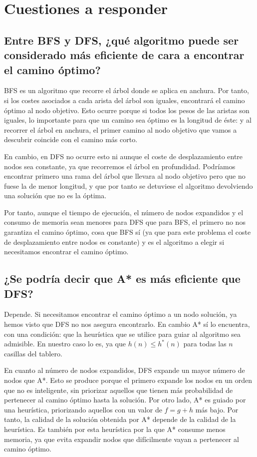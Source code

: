\documentclass[12pt]{article} %
\begin{document}
\section{Cuestiones a responder}
\subsection{Entre BFS y DFS, ¿qué algoritmo puede ser considerado más eficiente de cara a encontrar el camino óptimo?}

BFS es un algoritmo que recorre el árbol donde se aplica en anchura. Por tanto, si los costes asociados a cada arista del árbol son iguales, encontrará el camino óptimo al nodo objetivo. Esto ocurre porque si todos los pesos de las aristas son iguales, lo importante para que un camino sea óptimo es la longitud de éste: y al recorrer el árbol en anchura, el primer camino al nodo objetivo que vamos a descubrir coincide con el camino más corto.

En cambio, en DFS no ocurre esto ni aunque el coste de desplazamiento entre nodos sea constante, ya que recorremos el árbol en profundidad. Podríamos encontrar primero una rama del árbol que llevara al nodo objetivo pero que no fuese la de menor longitud, y que por tanto se detuviese el algoritmo devolviendo una solución que no es la óptima.

Por tanto, aunque el tiempo de ejecución, el número de nodos expandidos y el consumo de memoria sean menores para DFS que para BFS, el primero no nos garantiza el camino óptimo, cosa que BFS sí (ya que para este problema el coste de desplazamiento entre nodos es constante) y es el algoritmo a elegir si necesitamos encontrar el camino óptimo.

\subsection{¿Se podría decir que A* es más eficiente que DFS?}
Depende. Si necesitamos encontrar el camino óptimo a un nodo solución, ya hemos visto que DFS no nos asegura encontrarlo. En cambio A* sí lo encuentra, con una condición: que la heurística que se utilice para guiar al algoritmo sea admisible. En nuestro caso lo es, ya que $h(n) \leq h^*(n)$ para todas las $n$ casillas del tablero.

En cuanto al número de nodos expandidos, DFS expande un mayor número de nodos que A*. Esto se produce porque el primero expande los nodos en un orden que no es inteligente, sin priorizar aquellos que tienen más probabilidad de pertenecer al camino óptimo hasta la solución. Por otro lado, A* es guiado por una heurística, priorizando aquellos con un valor de $f = g + h$ más bajo. Por tanto, la calidad de la solución obtenida por A* depende de la calidad de la heurística. Es también por esta heurística por la que A* consume menos memoria, ya que evita expandir nodos que difícilmente vayan a pertenecer al camino óptimo.
\end{document}
